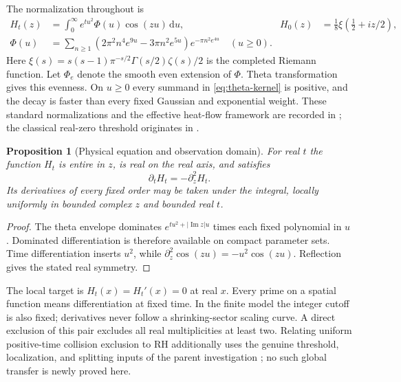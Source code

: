 \documentclass[11pt]{article}
\newtheorem{proposition}[theorem]{Proposition}
\theoremstyle{definition}
\theoremstyle{remark}
\newcommand{\dd}{\,\mathrm d}
\newcommand{\Ima}{\operatorname{Im}}
\begin{document}
The normalization throughout is
\begin{align}
 H_t(z)&=\int_0^\infty e^{tu^2}\Phi(u)\cos(zu)\dd u,
 &H_0(z)&=\tfrac18\xi(\tfrac12+iz/2),\label{eq:heat}\\
 \Phi(u)&=\sum_{n\ge1}
 (2\pi^2n^4e^{9u}-3\pi n^2e^{5u})e^{-\pi n^2e^{4u}}
 \quad(u\ge0).\label{eq:theta-kernel}
\end{align}
Here $\xi(s)=s(s-1)\pi^{-s/2}\Gamma(s/2)\zeta(s)/2$ is the completed
Riemann function. Let $\Phi_e$ denote the smooth even extension of
$\Phi$. Theta transformation gives this evenness. On $u\ge0$ every
summand in \eqref{eq:theta-kernel} is positive, and the decay is faster
than every fixed Gaussian and exponential weight. These standard
normalizations and the effective heat-flow framework are recorded in
\cite{polymath}; the classical real-zero threshold originates in
\cite{debruijn,newman}.

\begin{proposition}[Physical equation and observation domain]
\label{prop:physical}
For real $t$ the function $H_t$ is entire in $z$, is real on the real
axis, and satisfies
\begin{equation}
 \partial_tH_t=-\partial_z^2H_t.
 \label{eq:newman-sign}
\end{equation}
Its derivatives of every fixed order may be taken under the integral,
locally uniformly in bounded complex $z$ and bounded real $t$.
\end{proposition}
\begin{proof}
The theta envelope dominates $e^{tu^2+|\Ima z|u}$ times each fixed
polynomial in $u$. Dominated differentiation is therefore available on
compact parameter sets. Time differentiation inserts $u^2$, while
$\partial_z^2\cos(zu)=-u^2\cos(zu)$. Reflection gives the stated real
symmetry.
\end{proof}

The local target is $H_t(x)=H_t'(x)=0$ at real $x$. Every prime on a
spatial function means differentiation at fixed time. In the finite
model the integer cutoff is also fixed; derivatives never follow a
shrinking-sector scaling curve. A direct exclusion of this pair excludes
all real multiplicities at least two. Relating uniform positive-time
collision exclusion to RH additionally uses the genuine threshold,
localization, and splitting inputs of the parent investigation
\cite{heatnotes}; no such global transfer is newly proved here.
\end{document}
